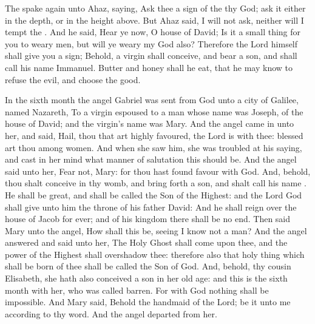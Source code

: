  The  spake again unto Ahaz, saying, Ask thee a sign of the  thy God; ask it either in the depth, or in the height above. But Ahaz said, I will not ask, neither will I tempt the . And he said, Hear ye now, O house of David; Is it a small thing for you to weary men, but will ye weary my God also? Therefore the Lord himself shall give you a sign; Behold, a virgin shall conceive, and bear a son, and shall call his name Immanuel. Butter and honey shall he eat, that he may know to refuse the evil, and choose the good.


\clearpage
{}

 In the sixth month the angel Gabriel was sent from God unto a city of Galilee, named Nazareth, To a virgin espoused to a man whose name was Joseph, of the house of David; and the virgin's name was Mary. And the angel came in unto her, and said, Hail, thou that art highly favoured, the Lord is with thee: blessed art thou among women. And when she saw him, she was troubled at his saying, and cast in her mind what manner of salutation this should be. And the angel said unto her, Fear not, Mary: for thou hast found favour with God. And, behold, thou shalt conceive in thy womb, and bring forth a son, and shalt call his name . He shall be great, and shall be called the Son of the Highest: and the Lord God shall give unto him the throne of his father David: And he shall reign over the house of Jacob for ever; and of his kingdom there shall be no end. Then said Mary unto the angel, How shall this be, seeing I know not a man? And the angel answered and said unto her, The Holy Ghost shall come upon thee, and the power of the Highest shall overshadow thee: therefore also that holy thing which shall be born of thee shall be called the Son of God. And, behold, thy cousin Elisabeth, she hath also conceived a son in her old age: and this is the sixth month with her, who was called barren. For with God nothing shall be impossible. And Mary said, Behold the handmaid of the Lord; be it unto me according to thy word. And the angel departed from her.

